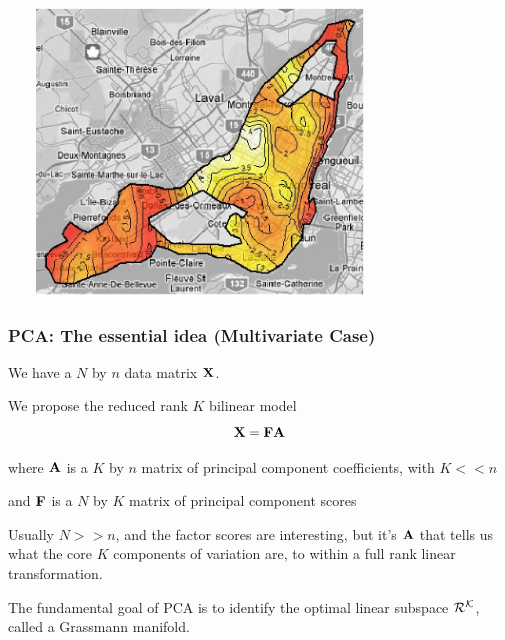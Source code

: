 \documentclass[11pt]{beamer}
\begin{document}
\begin{frame}

\begin{center}
\includegraphics[height=3in, width=4in]{figs/fig_Montreal_results_dirichlet_small_ter.eps}
\end{center}

\end{frame}


\begin{frame}

\frametitle{PCA: The essential idea (Multivariate Case)}

\bi
  \item We have a $N$ by $n$ data matrix $\mbox{\bf X}$.
  \item We propose the reduced rank $K$ bilinear model
  \[
    \mbox{\bf X} = \mbox{\bf F} \mbox{\bf A}
  \]
  \item where $\mbox{\bf A}$ is a $K$ by $n$ matrix of principal component coefficients, with $K << n$
  \item and $\mbox{\bf F}$ is a $N$ by $K$ matrix of principal component scores
   \item Usually $N >> n$, and the factor scores are interesting, but it's $\mbox{\bf A}$ that tells
  us what the core $K$ components of variation are, to within a full rank linear transformation.
  \item The fundamental goal of PCA is to identify the optimal linear subspace $\cal{R}^K$, called a Grassmann manifold.
\ei

\end{frame}

\end{document}
